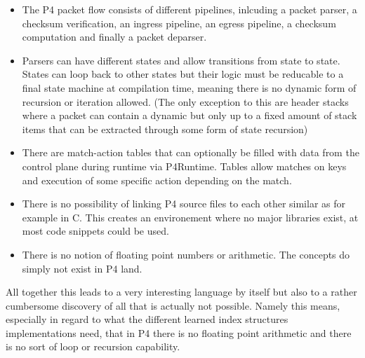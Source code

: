 \begin{itemize}
  \item The P4 packet flow consists of different pipelines, inlcuding a packet parser, a checksum verification, an ingress pipeline, an egress pipeline, a checksum computation and finally a packet deparser.
  \item Parsers can have different states and allow transitions from state to state. States can loop back to other states but their logic must be reducable to a final state machine at compilation time, meaning there is no dynamic form of recursion or iteration allowed. (The only exception to this are header stacks where a packet can contain a dynamic but only up to a fixed amount of stack items that can be extracted through some form of state recursion)
  \item There are match-action tables that can optionally be filled with data from the control plane during runtime via P4Runtime. Tables allow matches on keys and execution of some specific action depending on the match.
  \item There is no possibility of linking P4 source files to each other similar as for example in C. This creates an environement where no major libraries exist, at most code snippets could be used.
  \item There is no notion of floating point numbers or arithmetic. The concepts do simply not exist in P4 land.
\end{itemize}

All together this leads to a very interesting language by itself but also to a rather cumbersome discovery of all that is actually not possible. Namely this means, especially in regard to what the different learned index structures implementations need, that in P4 there is no floating point arithmetic and there is no sort of loop or recursion capability.
